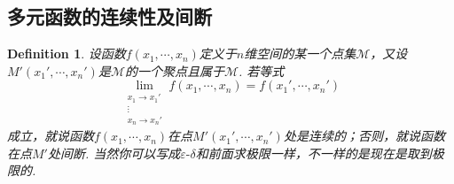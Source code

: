 \documentclass{article}
\newtheorem{definition}[theorem]{Definition}
\begin{document}
\newpage
\subsection{多元函数的连续性及间断}

\begin{definition}
\rm 设函数$f(x_1,\cdots,x_n)$定义于$n$维空间的某一个点集$\mathcal{M}$，又设$M'(x_1',\cdots,x_n')$是$\mathcal{M}$的一个聚点且属于$\mathcal{M}$. 若等式$$
\lim\limits_{\substack{x_1 \rightarrow x_1' \\ \vdots \\ x_n   \rightarrow x_n'}}f(x_1,\cdots,x_n) = f(x_1',\cdots,x_n')
$$
成立，就说函数$f(x_1,\cdots,x_n)$在点$M'(x_1',\cdots,x_n')$处是连续的；否则，就说函数在点$M'$处间断. {\color{blue} 当然你可以写成$\varepsilon\text{-}\delta$和前面求极限一样，不一样的是现在是取到极限的}.
\end{definition}
\end{document}
